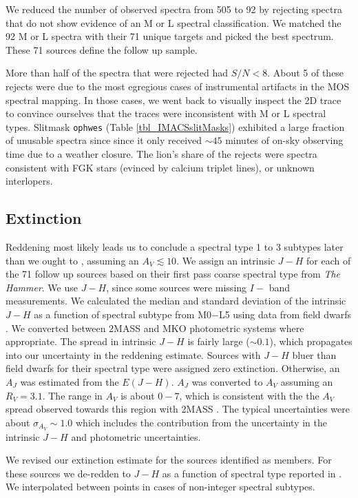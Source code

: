 We reduced the number of observed spectra from 505 to 92 by rejecting spectra that do not show evidence of an M or L spectral classification.  We matched the 92 M or L spectra with their 71 unique targets and picked the best spectrum.  These 71 sources define the follow up sample.  

More than half of the spectra that were rejected had $S/N < 8$.  About 5 of these rejects were due to the most egregious cases of instrumental artifacts in the MOS spectral mapping.  In those cases, we went back to visually inspect the 2D trace to convince ourselves that the traces were inconsistent with M or L spectral types.  Slitmask \texttt{ophwes} (Table \ref{tbl_IMACSslitMasks}) exhibited a large fraction of unusable spectra since since it only received $\sim45$ minutes of on-sky observing time due to a weather closure.  The lion's share of the rejects were spectra consistent with FGK stars (evinced by calcium triplet lines), or unknown interlopers.

\subsection{Extinction}
Reddening most likely leads us to conclude a spectral type 1 to 3 subtypes later than we ought to \citep{2010A&A...515A..75A}, assuming an $A_V\lesssim10$.  We assign an intrinsic $J-H$ for each of the 71 follow up sources based on their first pass coarse spectral type from \emph{The Hammer}.  We use $J-H$, since some sources were missing $I-$ band measurements.  We calculated the median and standard deviation of the intrinsic $J-H$ as a function of spectral subtype from M0$-$L5 using data from field dwarfs \citep{2011AJ....141...97W,2012ApJS..201...19D}.  We converted between 2MASS and MKO photometric systems where appropriate.  The spread in intrinsic $J-H$ is fairly large ($\sim0.1$), which propagates into our uncertainty in the reddening estimate.  Sources with $J-H$ bluer than field dwarfs for their spectral type were assigned zero extinction.  Otherwise, an $A_J$ was estimated from the $E(J-H)$.  $A_J$ was converted to $A_V$ assuming an $R_V=3.1$.  The range in $A_V$ is about $0 - 7$, which is consistent with the the $A_V$ spread observed towards this region with 2MASS \citep{2008A&A...489..143L}.  The typical uncertainties were about $\sigma_{A_V}\sim1.0$ which includes the contribution from the uncertainty in the intrinsic $J-H$ and photometric uncertainties.

We revised our extinction estimate for the sources identified as members.  For these sources we de-redden to $J-H$ as a function of spectral type reported in \citet{2013ApJS..208....9P}.  We interpolated between points in cases of non-integer spectral subtypes.


